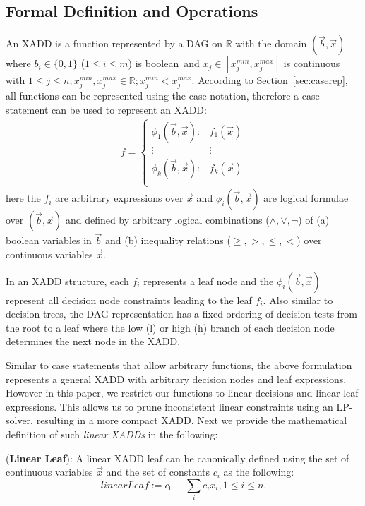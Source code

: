 \documentclass[twoside,11pt]{article}
\newenvironment{mydef}[1][Definition]{\begin{trivlist}
\item[\hskip \labelsep {\bfseries #1}]}{\end{trivlist}}
\begin{document}
\subsection{Formal Definition and Operations}
An XADD is a function represented by a DAG on $\mathbb{R}$ with the domain $(\vec{b},\vec{x})$ where $b_i \in \{ 0,1 \}$ ($1 \leq i \leq m$) is boolean$\,$
and $x_j \in \left[ x_j^{min}, x_j^{max}\right]$ is continuous with $1 \leq j \leq n; x_j^{min}, x_j^{max} \in \mathbb{R}; x_j^{min}< x_j^{max}$.
According to Section~\ref{sec:caserep}, all functions can be represented using the case notation, therefore a case statement can be used to represent an XADD:
{%
\begin{align}
f = 
\begin{cases}
  \phi_1(\vec{b},\vec{x}): & f_1 (\vec{x})\\ 
 \vdots&\vdots\\ 
  \phi_k(\vec{b},\vec{x}): & f_k(\vec{x}) \\ 
\end{cases} \label{eq:function_xadd}
\end{align}
}
here the $f_i$ are arbitrary expressions over $\vec{x}$ and $\phi_i(\vec{b},\vec{x})$ are logical formulae over $(\vec{b},\vec{x})$ and defined by arbitrary logical combinations ($\land,\lor,\neg$) of (a) boolean variables in $\vec{b}$ and (b) 
inequality relations ($\geq,>,\leq,<$) over continuous variables $\vec{x}$. 

In an XADD structure, each $f_i$ represents a leaf node and the $\phi_i(\vec{b},\vec{x})$ represent all decision node constraints leading to the leaf $f_i$. Also similar to decision trees, the DAG representation has a fixed ordering of decision tests from the root to a leaf where the low (l) or high (h) branch of each decision node determines the next node in the XADD. 

Similar to case statements that allow arbitrary functions, the above formulation represents a general XADD with arbitrary decision nodes and leaf expressions. However in this paper, we restrict our functions to linear decisions and linear leaf expressions. This allows us to prune inconsistent linear constraints using an LP-solver, resulting in a more compact XADD. Next we provide the mathematical definition of such \emph{linear XADDs} in the following: %

\begin{mydef}(\textbf{Linear Leaf}):
A linear XADD leaf can be canonically defined using the set of continuous variables $\vec{x}$ and the set of constants $c_i$ as the following:
\begin{equation}
\mathit{linearLeaf} := c_0+\sum_{i} c_i x_i , 1 \leq i \leq n. 
\nonumber
\end{equation}
\end{mydef}
\end{document}
